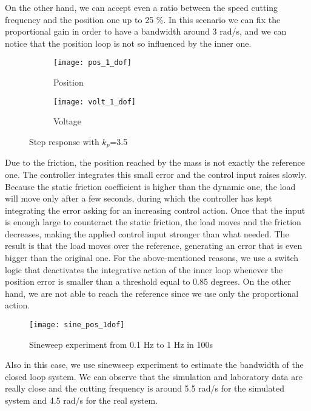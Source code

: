 On the other hand, we can accept even a ratio between the speed cutting frequency and the position one up to 25 \%. In this scenario we can fix the proportional gain in order to have a bandwidth around 3 rad/s, and we can notice that the position loop is not so influenced by the inner one.


\begin{figure*}[h]
	\centering
	\begin{subfigure}{0.45\columnwidth}
		\texttt{[image: pos\_1\_dof]}
		\caption{Position}
	\end{subfigure}
	\begin{subfigure}{0.45\columnwidth}
		\texttt{[image: volt\_1\_dof]}
		\caption{Voltage}
	\end{subfigure}
	\caption{Step response with $k_{p} $=3.5}
	\label{fig:Pos_1dof_3.5}
\end{figure*}

Due to the friction, the position reached by the mass is not exactly the reference one. The controller integrates this small error and the control input raises slowly. Because the static friction coefficient is higher than the dynamic one, the load will move only after a few seconds, during which the controller has kept integrating the error asking for an increasing control action.
Once that the input is enough large to counteract the static friction, the load moves and the friction decreases, making the applied control input stronger than what needed. The result is that the load moves over the reference, generating an error that is even bigger than the original one.
For the above-mentioned reasons, we use a switch logic that deactivates the integrative action of the inner loop whenever the position error is smaller than a threshold equal to 0.85 degrees. On the other hand, we are not able to reach the reference since we use only the proportional action.

\begin{figure*}[h]
	\centering
	\texttt{[image: sine\_pos\_1dof]}
	\caption{Sineweep experiment from 0.1 Hz to 1 Hz in 100s}
	\label{fig:sinesweep_pos_1dof}
\end{figure*}

Also in this case, we use sinewseep experiment to estimate the bandwidth of the closed loop system. We can observe that the simulation and laboratory data are really close and the cutting frequency is around 5.5 rad/s for the simulated system and 4.5 rad/s for the real system.

\newpage

